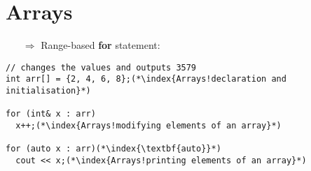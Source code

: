 \documentclass[10pt]{article}
\begin{document}
\section{Arrays}
\small
\begin{enumerate}
\item[$\Rightarrow$] Range-based \textbf{for} statement:
\end{enumerate}
\begin{lstlisting}
// changes the values and outputs 3579
int arr[] = {2, 4, 6, 8};(*\index{Arrays!declaration and initialisation}*)

for (int& x : arr)
  x++;(*\index{Arrays!modifying elements of an array}*)

for (auto x : arr)(*\index{\textbf{auto}}*)
  cout << x;(*\index{Arrays!printing elements of an array}*)
\end{lstlisting}
%
%
\end{document}
